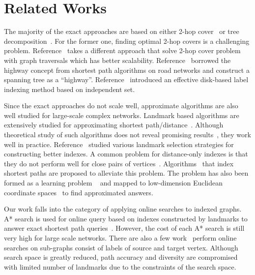 \section{Related Works}
\label{relatedwork} 

The majority of the exact approaches are based on either 2-hop cover~\cite{Cohen:2002:RDQ:545381.545503,Akiba:2013:FES:2463676.2465315} or tree decomposition~\cite{Akiba:2012:SQC:2247596.2247614,Wei:2010:TES:1807167.1807181}. For the former one, finding optimal 2-hop covers is a challenging problem. Reference~\cite{Akiba:2013:FES:2463676.2465315} takes a different approach that solve 2-hop cover problem with graph traversals which has better scalability. Reference~\cite{Jin:2012:HLA:2213836.2213887} borrowed the highway concept from shortest path algorithms on road networks and construct a spanning tree as a "`highway"'. Reference~\cite{Fu:2013:IIB:2536336.2536346} introduced an effective disk-based label indexing method based on independent set.

Since the exact approaches do not scale well, approximate algorithms are also well studied for large-scale complex networks. Landmark based algorithms are extensively studied for approximating shortest path/distance~\cite{Thorup:2005:ADO:1044731.1044732,Goldberg:2005:CSP:1070432.1070455,Potamias:2009:FSP:1645953.1646063,floreskul2014memory,Maier:2011:INS:1993077.1993079}. Although theoretical study of such algorithms does not reveal promising results~\cite{Thorup:2005:ADO:1044731.1044732}, they work well in practice. Reference~\cite{Potamias:2009:FSP:1645953.1646063,6927522} studied various landmark selection strategies for constructing better indexes. A common problem for distance-only indexes is that they do not perform well for close pairs of vertices~\cite{Akiba:2012:SQC:2247596.2247614}. Algorithms~\cite{Gubichev:2010:FAE:1871437.1871503,tretyakov2011fast,6399472} that index shortest paths are proposed to alleviate this problem. The problem has also been formed as a learning problem ~\cite{7004250} and mapped to low-dimension Euclidean coordinate spaces~\cite{Zhao:2010:OSP:1863190.1863199} to find approximated answers.

Our work falls into the category of applying online searches to indexed graphs. A* search is used for online query based on indexes constructed by landmarks to answer exact shortest path queries~\cite{Goldberg:2005:CSP:1070432.1070455}. However, the cost of each A* search is still very high for large scale networks. There are also a few work~\cite{Gubichev:2010:FAE:1871437.1871503, 6399472} perform online searches on sub-graphs consist of labels of source and target vertex. Although search space is greatly reduced, path accuracy and diversity are compromised with limited number of landmarks due to the constraints of the search space.
